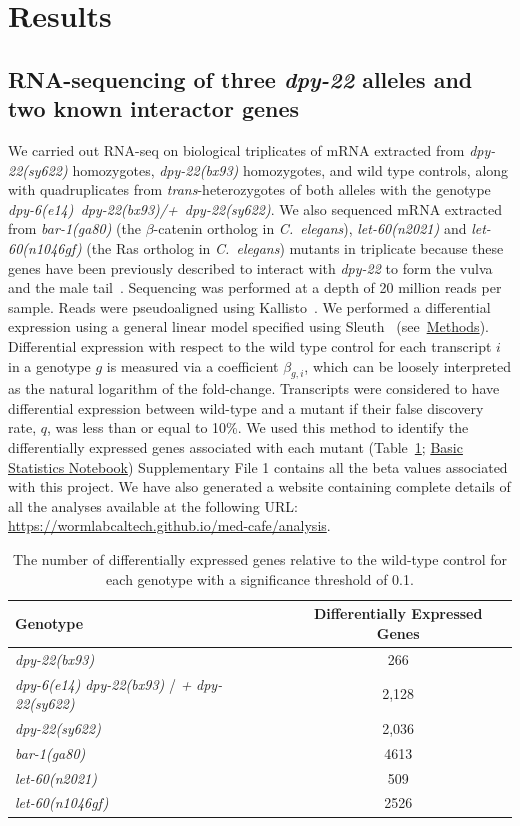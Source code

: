 \documentclass[9pt,twocolumn,twoside]{gsajnl}
\newcommand{\cel}{\emph{C.~elegans}}
\newcommand{\gene}[1]{\mbox{\emph{#1}}}
\newcommand{\dpy}[1]{\gene{dpy-22#1}}
\newcommand{\strongn}{2,036}
\newcommand{\weakn}{266}
\newcommand{\transn}{2,128}
\newcommand{\bx}{\dpy{(bx93)}}
\newcommand{\sy}{\dpy{(sy622)}}
\begin{document}
\section*{Results}
\subsection*{RNA-sequencing of three \gene{dpy-22} alleles and two known
             interactor genes}
We carried out RNA-seq on biological triplicates of mRNA extracted from \sy{}
homozygotes, \bx{} homozygotes, and wild type controls, along with
quadruplicates from \emph{trans}-heterozygotes of both alleles with the genotype
\gene{dpy-6(e14) dpy-22(bx93)/+ dpy-22(sy622)}. We also sequenced mRNA extracted
from \gene{bar-1(ga80)} (the $\beta$-catenin ortholog in \cel{}),
\gene{let-60(n2021)} and \gene{let-60(n1046gf)} (the Ras ortholog in \cel{})
mutants in triplicate because these genes have been previously described to
interact with \dpy{} to form the vulva~\citep{Moghal2003} and the male
tail~\citep{Zhang2000}. Sequencing was performed at a depth of 20 million reads
per sample. Reads were pseudoaligned using Kallisto~\citep{Bray2016}. We
performed a differential expression using a general linear model specified using
Sleuth~\citep{Pimentel2016a} (see~\hyperref[sec:methods]{Methods}). Differential
expression with respect to the wild type control for each transcript $i$ in a
genotype $g$ is measured via a coefficient $\beta_{g, i}$, which can be loosely
interpreted as the natural logarithm of the fold-change. Transcripts were
considered to have differential expression between wild-type and a mutant if
their false discovery rate, $q$, was less than or equal to 10\%. We used this
method to identify the differentially expressed genes associated with each
mutant (Table~\ref{tab:numbers};
\href{https://wormlabcaltech.github.io/med-cafe/notebook/basic.html}{Basic
Statistics Notebook}) Supplementary File 1 contains all the beta values
associated with this project. We have also generated a website containing
complete details of all the analyses available at the following URL:\@
\url{https://wormlabcaltech.github.io/med-cafe/analysis}.

\begin{table}
 \centering
 \begin{tabular}{lc}
   \toprule
   Genotype & Differentially Expressed Genes\\
   \midrule
   \bx{} & \weakn{}\\
   \gene{dpy-6(e14)} \dpy{(bx93)} / \emph{+} \dpy{(sy622)} & \transn{}\\
   \sy{} & \strongn{}\\
   \gene{bar-1(ga80)} & 4613\\
   \gene{let-60(n2021)} & 509\\
   \gene{let-60(n1046gf)} & 2526\\
   \bottomrule
 \end{tabular}
 \caption{
          The number of differentially expressed genes relative to the wild-type
          control for each genotype with a significance threshold of 0.1.
          }
\label{tab:numbers}
\end{table}
\end{document}
